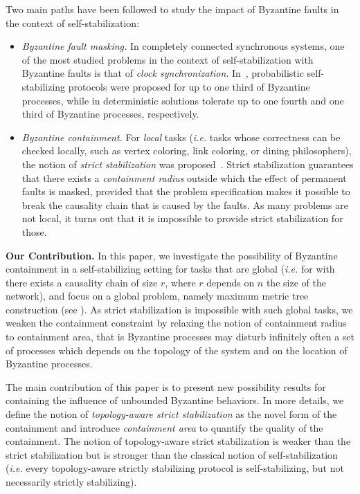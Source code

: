 \documentclass[11pt]{article}
\begin{document}
Two main paths have been followed to study the impact of Byzantine faults in the context of self-stabilization:
\begin{itemize}
\item \emph{Byzantine fault masking.} In completely connected synchronous systems, one of the most studied problems in the context of self-stabilization with Byzantine faults is that of \emph{clock synchronization}. In~\cite{BDH08c,DW04j}, probabilistic self-stabilizing protocols were proposed for up to one third of Byzantine processes, while in \cite{DH07cb,HDD06c} deterministic solutions tolerate up to one fourth and one third of Byzantine processes, respectively.
\item \emph{Byzantine containment.} For \emph{local} tasks (\emph{i.e.} tasks whose correctness can be checked locally, such as vertex coloring, link coloring, or dining philosophers), the notion of \emph{strict stabilization} was proposed~\cite{NA02c,SOM05c,MT07j}. Strict stabilization guarantees that there exists a \emph{containment radius} outside which the effect of permanent faults is masked, provided that the problem specification makes it possible to break the causality chain that is caused by the faults. As many problems are not local, it turns out that it is impossible to provide strict stabilization for those.
\end{itemize}

\noindent\textbf{Our Contribution.} In this paper, we investigate the possibility of Byzantine containment in a self-stabilizing setting for tasks that are global (\emph{i.e.} for with there exists a causality chain of size $r$, where $r$ depends on $n$ the size of the network), and focus on a global problem, namely maximum metric tree construction (see \cite{GS99c,GS03j}). As strict stabilization is impossible with such global tasks, we weaken the containment constraint by relaxing the notion of containment radius to containment area, that is Byzantine processes may disturb infinitely often a set of processes which depends on the topology of the system and on the location of Byzantine processes.

The main contribution of this paper is to present new possibility results for containing the influence of unbounded Byzantine behaviors. In more details, we define the notion of \emph{topology-aware strict stabilization} as the novel form of the containment and introduce \emph{containment area} to quantify the quality of the containment.
The notion of topology-aware strict stabilization is weaker than the strict stabilization but is stronger than the classical notion of self-stabilization (\emph{i.e.} every topology-aware strictly stabilizing protocol is self-stabilizing, but not necessarily strictly stabilizing).
\end{document}
